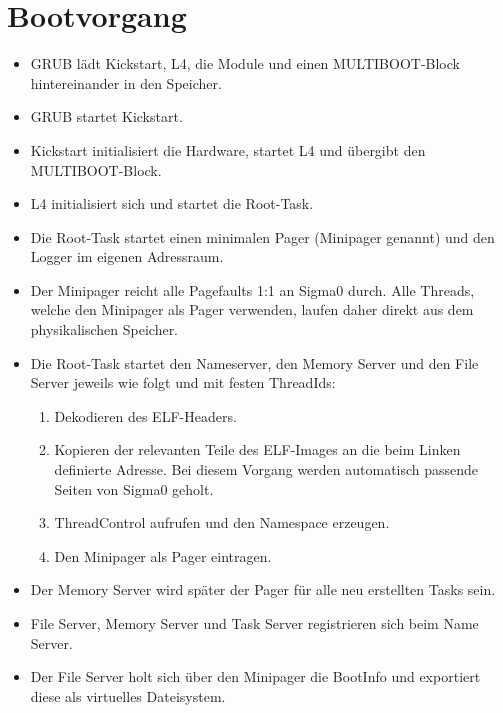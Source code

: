 \section{Bootvorgang}

\begin{itemize}
	\item GRUB lädt Kickstart, L4, die Module und einen MULTIBOOT-Block hintereinander in den Speicher.
	
	\item GRUB startet Kickstart.
	
	\item Kickstart initialisiert die Hardware, startet L4 und übergibt den MULTIBOOT-Block.
	
	\item L4 initialisiert sich und startet die Root-Task.
	
	\item Die Root-Task startet einen minimalen Pager (Minipager genannt) und den Logger im eigenen Adressraum.
	
	\item Der Minipager reicht alle Pagefaults 1:1 an Sigma0 durch. Alle Threads, welche den Minipager als Pager verwenden, laufen daher direkt aus dem physikalischen Speicher.

	\item Die Root-Task startet den Nameserver, den Memory Server und den File Server jeweils wie folgt und mit festen ThreadIds:
	\begin{enumerate}
		\item Dekodieren des ELF-Headers.
		\item Kopieren der relevanten Teile des ELF-Images an die beim Linken definierte Adresse. Bei diesem Vorgang werden automatisch passende Seiten von Sigma0 geholt.
		\item ThreadControl aufrufen und den Namespace erzeugen.
		\item Den Minipager als Pager eintragen.
	\end{enumerate}
	
	\item Der Memory Server wird später der Pager für alle neu erstellten Tasks sein.
	
	\item File Server, Memory Server und Task Server registrieren sich beim Name Server.
	
	\item Der File Server holt sich über den Minipager die BootInfo und exportiert diese als virtuelles Dateisystem.
	

\end{itemize}
